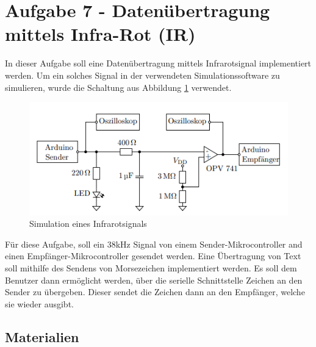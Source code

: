 \section{Aufgabe 7 - Datenübertragung mittels Infra-Rot (IR)}
\label{sec:aufgabe-7---datenuebertragung-mittels-infra-rot-ir}

In dieser Aufgabe soll eine Datenübertragung mittels Infrarotsignal implementiert werden.
Um ein solches Signal in der verwendeten Simulationssoftware zu simulieren, wurde die Schaltung aus Abbildung \ref{fig:a7-simulation-infrarot} verwendet.

\begin{figure}
    \centering
    \includegraphics{pictures/a7-addon.png}
    \caption{Simulation eines Infrarotsignals}
    \label{fig:a7-simulation-infrarot}
\end{figure}

Für diese Aufgabe, soll ein 38kHz Signal von einem Sender-Mikrocontroller and einen Empfänger-Mikrocontroller gesendet werden.
Eine Übertragung von Text soll mithilfe des Sendens von Morsezeichen implementiert werden.
Es soll dem Benutzer dann ermöglicht werden, über die serielle Schnittstelle Zeichen an den Sender zu übergeben.
Dieser sendet die Zeichen dann an den Empfänger, welche sie wieder ausgibt.

\subsection{Materialien}
\label{subsec:a7-materialien}


